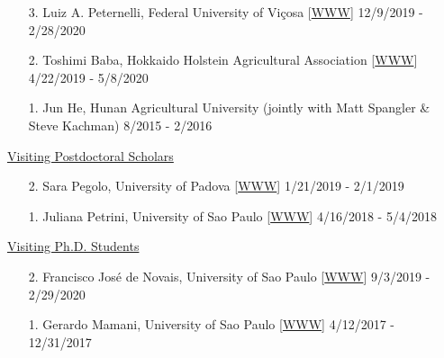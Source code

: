 \documentclass[margin,line,10pt]{res}
\begin{document}
\begin{resume}
\begin{enumerate}
\item [3.] Luiz A. Peternelli, Federal University of Vi\c cosa [\textcolor{blue}{\href{http://www.dpi.ufv.br/~peternelli/}{WWW}}]  \hfill 12/9/2019 - 2/28/2020

  \vspace{0.3cm}

      
\item [2.] Toshimi Baba, Hokkaido Holstein Agricultural Association [\textcolor{blue}{\href{https://researchmap.jp/t-baba/?lang=english}{WWW}}]  \hfill  4/22/2019 - 5/8/2020
  
  \vspace{0.3cm}

\item [1.] Jun He, Hunan Agricultural University (jointly with Matt Spangler \& Steve Kachman)  \hfill  8/2015 - 2/2016 
\end{enumerate}



\begin{flushleft}
\hspace{0.2cm} \underline{Visiting Postdoctoral Scholars}
\end{flushleft}
\begin{enumerate}
\item [2.] Sara Pegolo,  University of Padova [\textcolor{blue}{\href{https://www.researchgate.net/profile/Sara_Pegolo}{WWW}}]  \hfill 1/21/2019 - 2/1/2019
  
  \vspace{0.3cm}

\item [1.] Juliana Petrini,  University of Sao Paulo  [\textcolor{blue}{\href{https://www.researchgate.net/profile/Juliana_Petrini}{WWW}}]  \hfill  4/16/2018 - 5/4/2018
\end{enumerate}






\begin{flushleft}
\hspace{0.2cm} \underline{Visiting Ph.D. Students}
\end{flushleft}
\begin{enumerate}
\item [2.] Francisco Jos\'{e} de Novais,  University of Sao Paulo [\textcolor{blue}{\href{https://fjnovais.github.io/}{WWW}}]  \hfill  9/3/2019 - 2/29/2020

\vspace{0.3cm}

\item [1.] Gerardo Mamani, University of Sao Paulo  [\textcolor{blue}{\href{https://github.com/gerardocorn}{WWW}}]  \hfill 4/12/2017 - 12/31/2017
\end{enumerate}




\end{resume}
\end{document}
